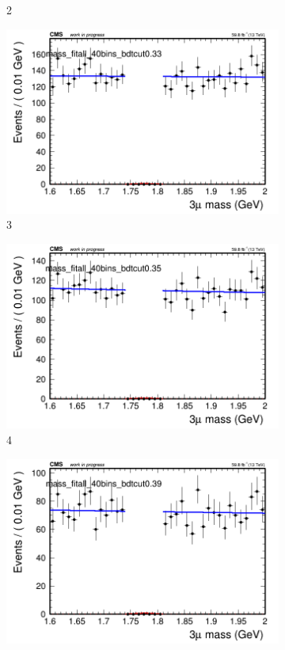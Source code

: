 \begin{figure}[h!]
\begin{subfigure}{0.2\textwidth}
        \caption{2}
    \end{subfigure}
    \begin{subfigure}{0.2\textwidth}
        \includegraphics[width=\textwidth]{power_law/plots/all/massfit_all_40bins_bdtcut0.33.png}
        \caption{3}
    \end{subfigure}
    \begin{subfigure}{0.2\textwidth}
        \includegraphics[width=\textwidth]{power_law/plots/all/massfit_all_40bins_bdtcut0.35.png}
        \caption{4}
    \end{subfigure}
    \begin{subfigure}{0.2\textwidth}
        \includegraphics[width=\textwidth]{power_law/plots/all/massfit_all_40bins_bdtcut0.39.png}

\end{subfigure}
\end{figure}
